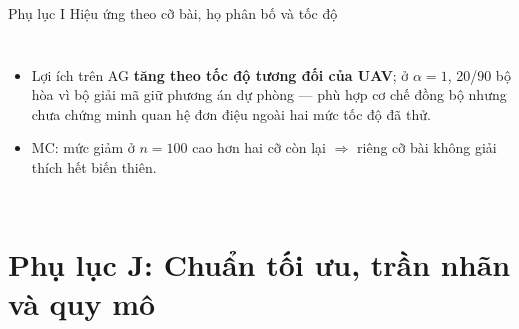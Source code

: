 \documentclass[aspectratio=169,10pt,t,xcolor={table}]{beamer}
\newcommand{\apptitle}[2]{Phụ lục #1 \textperiodcentered{} #2}
\begin{document}
\begin{frame}[label=appI]{\apptitle{I}{Hiệu ứng theo cỡ bài, họ phân bố và tốc độ}}
\begin{columns}[T,onlytextwidth]
\begin{itemize}
\item Lợi ích trên AG \textbf{tăng theo tốc độ tương đối của UAV}; ở $\alpha=1$, 20/90 bộ hòa vì bộ giải mã giữ phương án dự phòng --- phù hợp cơ chế đồng bộ nhưng chưa chứng minh quan hệ đơn điệu ngoài hai mức tốc độ đã thử.
\item MC: mức giảm ở $n=100$ cao hơn hai cỡ còn lại $\Rightarrow$ riêng cỡ bài không giải thích hết biến thiên.
\end{itemize}
\end{columns}
\end{frame}

\section{Phụ lục J: Chuẩn tối ưu, trần nhãn và quy mô}
\end{document}
